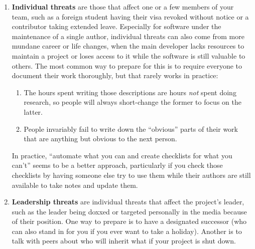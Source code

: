 \documentclass[10pt,letterpaper]{article}
\begin{document}
\begin{enumerate}
\item
  \textbf{Individual threats} are those that affect one or a few members   of your team,
  such as a foreign student having their visa revoked without notice
  or a contributor taking extended leave.
  Especially for   software under the maintenance of a single author,
  individual threats can also come from more mundane career or life changes,
  when the main developer lacks resources to maintain a project or loses access to it
  while the software is still valuable to others.
  The most common way to prepare for this is to require everyone to document their work thoroughly,
  but that rarely works in practice:
  \begin{enumerate}
  \item
    The hours spent writing those descriptions are hours \emph{not} spent doing research,
    so people will always short-change the former to focus on the latter.
  \item
    People invariably fail to write down the ``obvious'' parts of their work
    that are anything but obvious to the next person.
  \end{enumerate}
  In practice,
  ``automate what you can and create checklists for what you can't'' seems to be a better approach,
  particularly if you check those checklists
  by having someone else try to use them while their authors are still available to take notes and update them.

\item
  \textbf{Leadership threats} are individual threats that affect the project's leader,
  such as the leader being doxxed or targeted personally in the media because of their position.
  One way to prepare is to have a designated successor
  (who can also stand in for you if you ever want to take a holiday).
  Another is to talk with peers about who will inherit what if your project is shut down.


\end{enumerate}
\end{document}
